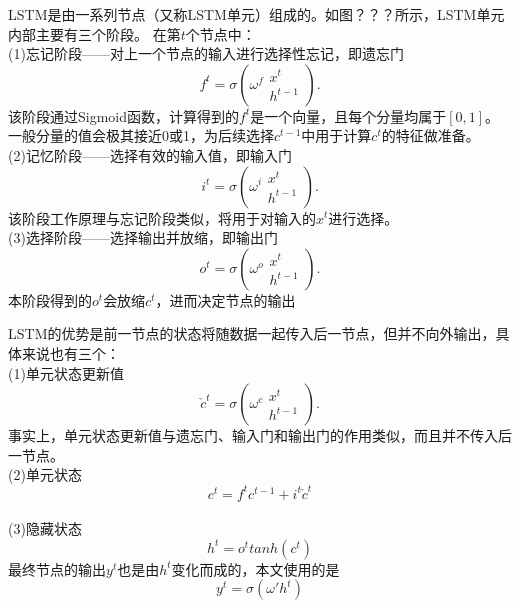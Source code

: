 LSTM是由一系列节点（又称LSTM单元）组成的。如图？？？所示，LSTM单元内部主要有三个阶段。
在第$t$个节点中：
\\
(1)忘记阶段——对上一个节点的输入进行选择性忘记，即遗忘门
\begin{equation}
    f^{t}=\sigma\left(\omega^{f} \begin{array}{l}
x^t \\
h^{t-1}
\end{array}\right).
\end{equation}
该阶段通过Sigmoid函数，计算得到的$f^{t}$是一个向量，且每个分量均属于$[0,1]$。
一般分量的值会极其接近0或1，为后续选择$c^{t-1}$中用于计算$c^t$的特征做准备。
\\
(2)记忆阶段——选择有效的输入值，即输入门
\begin{equation}
    i^{t}=\sigma\left(\omega^{i} \begin{array}{r}
x^t \\
h^{t-1}
\end{array}\right).
\end{equation}
该阶段工作原理与忘记阶段类似，将用于对输入的$x^t$进行选择。
\\
(3)选择阶段——选择输出并放缩，即输出门
\begin{equation}
    o^{t}=\sigma\left(\omega^{o} \begin{array}{r}
x^t \\
h^{t-1}
\end{array}\right).
\end{equation}
本阶段得到的$o^{t}$会放缩$c^t$，进而决定节点的输出

LSTM的优势是前一节点的状态将随数据一起传入后一节点，但并不向外输出，具体来说也有三个：
\\
(1)单元状态更新值
\begin{equation}
    \check{c}^t=\sigma\left(\omega^{c} \begin{array}{l}
x^t \\
h^{t-1}
\end{array}\right).
\end{equation}
事实上，单元状态更新值与遗忘门、输入门和输出门的作用类似，而且并不传入后一节点。
\\
(2)单元状态
\begin{equation}
c^t=f^tc^{t-1}+i^t\check{c}^t
\end{equation}
\\
(3)隐藏状态
\begin{equation}
   h^t=o^ttanh(c^t)
\end{equation}
最终节点的输出$y^t$也是由$h^t$变化而成的，本文使用的是
\begin{equation}
y^t=\sigma(\omega'h^t)
\end{equation}


